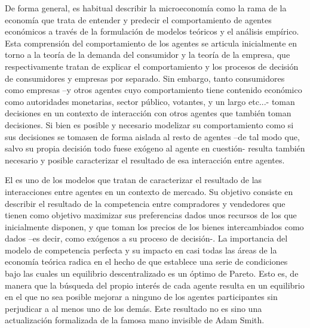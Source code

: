 \documentclass{nuevotema}
\begin{document}
\ideaclave

De forma general, es habitual describir la microeconomía como la rama de la economía que trata de entender y predecir el comportamiento de agentes económicos a través de la formulación de modelos teóricos y el análisis empírico. Esta comprensión del comportamiento de los agentes se articula inicialmente en torno a la teoría de la demanda del consumidor y la teoría de la empresa, que respectivamente tratan de explicar el comportamiento y los procesos de decisión de consumidores y empresas por separado. Sin embargo, tanto consumidores como empresas --y otros agentes cuyo comportamiento tiene contenido económico como autoridades monetarias, sector público, votantes, y un largo etc...- toman decisiones en un contexto de interacción con otros agentes que también toman decisiones. Si bien es posible y necesario modelizar su comportamiento como si sus decisiones se tomasen de forma aislada al resto de agentes --de tal modo que, salvo su propia decisión todo fuese exógeno al agente en cuestión- resulta también necesario y posible caracterizar el resultado de esa interacción entre agentes.

El  es uno de los modelos que tratan de caracterizar el resultado de las interacciones entre agentes en un contexto de mercado. Su objetivo consiste en describir el resultado de la competencia entre compradores y vendedores que tienen como objetivo maximizar sus preferencias dados unos recursos de los que inicialmente disponen, y que toman los precios de los bienes intercambiados como dados --es decir, como exógenos a su proceso de decisión-. La importancia del modelo de competencia perfecta y su impacto en casi todas las áreas de la economía teórica radica en el hecho de que establece una serie de condiciones bajo las cuales un equilibrio descentralizado es un óptimo de Pareto. Esto es, de manera que la búsqueda del propio interés de cada agente resulta en un equilibrio en el que no sea posible mejorar a ninguno de los agentes participantes sin perjudicar a al menos uno de los demás. Este resultado no es sino una actualización formalizada de la famosa mano invisible de Adam Smith.
\end{document}
